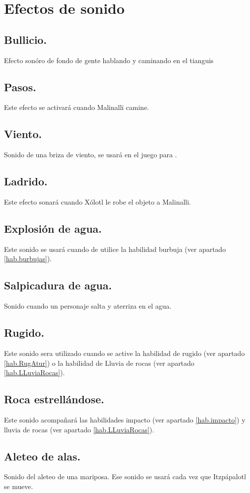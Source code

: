 \section{Efectos de sonido} 
\subsection{Bullicio.} \label{SFX:Bullicio}
Efecto sonóro de fondo de gente hablando y caminando en el tianguis
\subsection{Pasos.}\label{SFX:Pasos}
Este efecto se activará cuando Malinalli camine.
\subsection{Viento.}\label{SFX:Viento}
Sonido de una briza de viento, se usará en el juego para .
\subsection{Ladrido.}\label{SFX:Ladrido}
Este efecto sonará cuando Xólotl le robe el objeto a Malinalli.
\subsection{Explosión de agua.} \label{SFX:ExpAgua}
 Este sonido se usará cuando de utilice la habilidad burbuja (ver apartado \ref{hab.burbujas}).
\subsection{Salpicadura de agua.} \label{SFX:SalAgua}
Sonido cuando un personaje salta y aterriza en el agua.  
\subsection{Rugido.} \label{SFX:Rugido}
Este sonido sera utilizado cuando se active la habilidad de rugido (ver apartado \ref{hab.RugAtur}) o la habilidad de Lluvia de rocas (ver apartado \ref{hab.LLuviaRocas}).
\subsection{Roca estrellándose.} \label{SFX:RocaEs}
Este sonido acompañará las habilidades impacto (ver apartado \ref{hab.impacto}) y lluvia de rocas (ver apartado \ref{hab.LLuviaRocas}).
\subsection{Aleteo de alas.} \label{SFX:Aleteo}
Sonido del aleteo de una mariposa. Ese sonido se usará cada vez que Itzpápalotl se mueve.